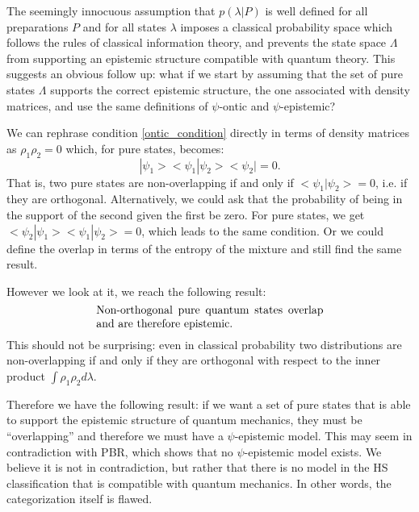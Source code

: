 \documentclass[twocolumn,prl,floatfix,superscriptaddress]{revtex4-2}
\begin{document}
The seemingly innocuous assumption that $p(\lambda|P)$ is well defined for all preparations $P$ and for all states $\lambda$ imposes a classical probability space which follows the rules of classical information theory, and prevents the state space $\Lambda$ from supporting an epistemic structure compatible with quantum theory. This suggests an obvious follow up: what if we start by assuming that the set of pure states $\Lambda$ supports the correct epistemic structure, the one associated with density matrices, and use the same definitions of $\psi$-ontic and $\psi$-epistemic?

We can rephrase condition \ref{ontic_condition} directly in terms of density matrices as $\rho_1 \rho_2 = 0$ which, for pure states, becomes:
\begin{equation}
	|\psi_1><\psi_1|\psi_2><\psi_2| = 0.
\end{equation}
That is, two pure states are non-overlapping if and only if $<\psi_1|\psi_2>=0$, i.e. if they are orthogonal. Alternatively, we could ask that the probability of being in the support of the second given the first be zero. For pure states, we get $<\psi_2|\psi_1><\psi_1|\psi_2> = 0$, which leads to the same condition. Or we could define the overlap in terms of the entropy of the mixture and still find the same result.

However we look at it, we reach the following result:
\begin{align}\label{conclusion}
	\parbox{2.8in}{Non-orthogonal pure quantum states overlap and are therefore epistemic.}
\end{align}
This should not be surprising: even in classical probability two distributions are non-overlapping if and only if they are orthogonal with respect to the inner product $\int \rho_1 \rho_2 d\lambda$.

Therefore we have the following result: if we want a set of pure states that is able to support the epistemic structure of quantum mechanics, they must be ``overlapping'' and therefore we must have a $\psi$-epistemic model. This may seem in contradiction with PBR, which shows that no $\psi$-epistemic model exists. We believe it is not in contradiction, but rather that there is no model in the HS classification that is compatible with quantum mechanics. In other words, the categorization itself is flawed.


\end{document}
